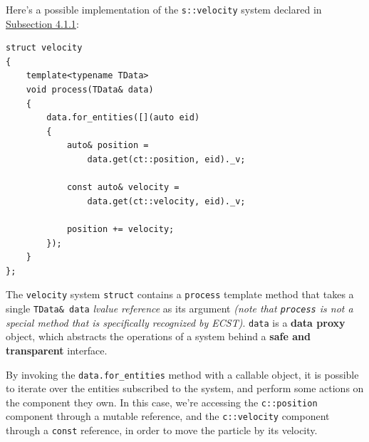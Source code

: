 \documentclass[twoside, 12pt, a4paper, openany]{book}
\begin{document}
Here's a possible implementation of the
\texttt{s::velocity}
system declared in
\protect\hyperlink{code_example_settings_definition}{Subsection 4.1.1}:

\begin{verbatim}
struct velocity
{
    template<typename TData>
    void process(TData& data)
    {
        data.for_entities([](auto eid)
        {
            auto& position =
                data.get(ct::position, eid)._v;

            const auto& velocity =
                data.get(ct::velocity, eid)._v;

            position += velocity;
        });
    }
};
\end{verbatim}

The
\texttt{velocity}
system
\texttt{struct}
contains a
\texttt{process}
template method that takes a single
\texttt{TData& data}
\emph{lvalue reference} as its argument \emph{(note that
\texttt{process}
is not a special method that is specifically recognized by ECST)}.
\texttt{data}
is a \textbf{data proxy} object, which abstracts the operations of a
system behind a \textbf{safe and transparent} interface.

By invoking the
\texttt{data.for_entities}
method with a callable object, it is possible to iterate over the
entities subscribed to the system, and perform some actions on the
component they own. In this case, we're accessing the
\texttt{c::position}
component through a mutable reference, and the
\texttt{c::velocity}
component through a
\texttt{const}
reference, in order to move the particle by its velocity.
\end{document}

